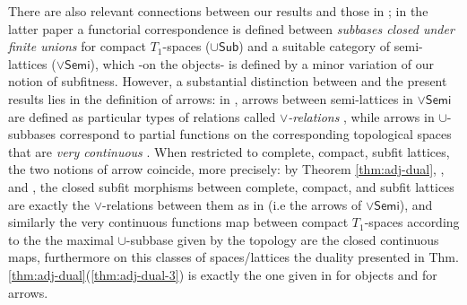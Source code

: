 \documentclass{article}
\theoremstyle{plain}
\theoremstyle{definition}
\theoremstyle{remark}
\newcommand{\bool}[1]{\mathsf{#1}}
\newcommand{\0}{\mathbbm 0}
\newcommand{\1}{\mathbbm 1}
\newcommand{\2}{\mathbbm 2}
\begin{document}
There are also relevant connections between our results and those in \cite{bice2020wallmandualitysemilatticesubbases}; in the latter paper a functorial correspondence is defined between \emph{subbases closed under finite unions} for compact \(T_1\)-spaces (\(\cup\bool{Sub}\)) and a suitable category of semi-lattices (\(\vee\bool{Semi}\)), which -on the objects- is defined by a minor variation of our notion of subfitness. 
However, a substantial distinction between \cite{bice2020wallmandualitysemilatticesubbases} and the present results lies in the definition of arrows: in \cite[Def. 8.4]{bice2020wallmandualitysemilatticesubbases}, arrows between semi-lattices in \(\vee\bool{Semi}\) are defined as particular types of relations called \emph{\(\vee\)-relations} \cite[Def. 8.4]{bice2020wallmandualitysemilatticesubbases}, while arrows in \(\cup\)-subbases correspond to partial functions on the corresponding topological spaces that are \textit{very continuous} \cite[Def. 8.1]{bice2020wallmandualitysemilatticesubbases}. 
When restricted to complete, compact, subfit lattices, the two notions of arrow coincide, more precisely:  
by  Theorem \ref{thm:adj-dual}, \cite[Thm. 8.9]{bice2020wallmandualitysemilatticesubbases}, and \cite[Thm. 8.6]{bice2020wallmandualitysemilatticesubbases}, the closed subfit morphisms between complete, compact, and subfit lattices are exactly the \(\vee\)-relations between them as in \cite[Def. 8.4]{bice2020wallmandualitysemilatticesubbases} (i.e the arrows of \(\vee\bool{Semi}\)), and similarly the very continuous functions map between compact $T_1$-spaces according to the the maximal $\cup$-subbase given by the topology are the closed continuous maps, furthermore on this classes of spaces/lattices the duality presented in Thm. \ref{thm:adj-dual}(\ref{thm:adj-dual-3})  is exactly the one given in \cite[Thm. 7.9]{bice2020wallmandualitysemilatticesubbases} for objects and \cite[Sec. 8]{bice2020wallmandualitysemilatticesubbases} for arrows. 
\end{document}
